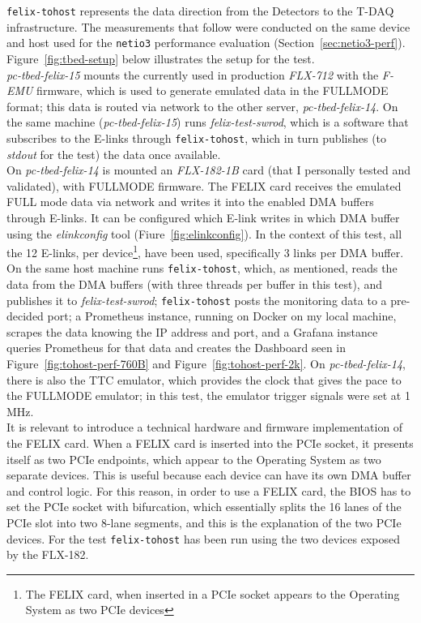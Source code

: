 \texttt{felix-tohost} represents the data direction from the Detectors to the T-DAQ infrastructure. The measurements that follow were conducted on the same device and host used for the \texttt{netio3} performance evaluation (Section~\ref{sec:netio3-perf}). 
Figure~\ref{fig:tbed-setup} below illustrates the setup for the test.\\
\emph{pc-tbed-felix-15} mounts the currently used in production \emph{FLX-712} with the \emph{F-EMU} firmware, which is used to generate emulated data in the FULLMODE format; this data is routed via network to the other server, \emph{pc-tbed-felix-14}.
On the same machine (\emph{pc-tbed-felix-15}) runs \emph{felix-test-swrod}, which is a software that subscribes to the \acs{E-link}s through \texttt{felix-tohost}, which in turn publishes (to \emph{stdout} for the test) the data once available.\\
On \emph{pc-tbed-felix-14} is mounted an \emph{FLX-182-1B} card (that I personally tested and validated), with FULLMODE firmware. The \acs{FELIX} card receives the emulated FULL mode data via network and writes it into the enabled \acs{DMA} buffers through \acs{E-link}s. It can be configured which \acs{E-link} writes in which \acs{DMA} buffer using the \emph{elinkconfig} tool (Fiure~\ref{fig:elinkconfig}). In the context of this test, all the 12 \acs{E-link}s, per device\footnote{The FELIX card, when inserted in a PCIe socket appears to the Operating System as two PCIe devices}, have been used, specifically 3 links per \acs{DMA} buffer. On the same host machine runs \texttt{felix-tohost}, which, as mentioned, reads the data from the \acs{DMA} buffers (with three threads per buffer in this test), and publishes it to \emph{felix-test-swrod}; \texttt{felix-tohost} posts the monitoring data to a pre-decided port; a Prometheus instance, running on Docker on my local machine, scrapes the data knowing the IP address and port, and a Grafana instance queries Prometheus for that data and creates the Dashboard seen in Figure~\ref{fig:tohost-perf-760B} and Figure~\ref{fig:tohost-perf-2k}. On \emph{pc-tbed-felix-14}, there is also the \acl{TTC} emulator, which provides the clock that gives the pace to the FULLMODE emulator; in this test, the emulator trigger signals were set at 1 MHz.\\
It is relevant to introduce a technical hardware and firmware implementation of the \acs{FELIX} card. When a \acs{FELIX} card is inserted into the \acs{PCIe} socket, it presents itself as two \acs{PCIe} endpoints, which appear to the Operating System as two separate devices. This is useful because each device can have its own \acs{DMA} buffer and control logic. For this reason, in order to use a \acs{FELIX} card, the BIOS has to set the \acs{PCIe} socket with bifurcation, which essentially splits the 16 lanes of the \acs{PCIe} slot into two 8-lane segments, and this is the explanation of the two \acs{PCIe} devices. For the test \texttt{felix-tohost} has been run using the two devices exposed by the FLX-182.\\
